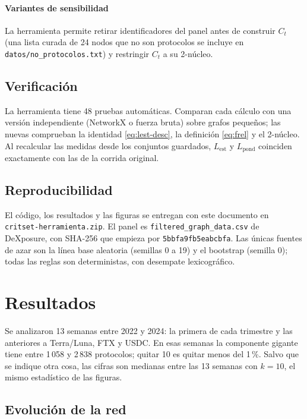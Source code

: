 \documentclass[journal]{IEEEtran}
\begin{document}
\paragraph{Variantes de sensibilidad} La herramienta permite retirar
identificadores del panel antes de construir $C_t$ (una lista curada de 24
nodos que no son protocolos se incluye en \texttt{datos/no\_protocolos.txt}) y
restringir $C_t$ a su 2-núcleo.

\subsection{Verificación}

La herramienta tiene 48 pruebas automáticas. Comparan cada cálculo con una
versión independiente (NetworkX o fuerza bruta) sobre grafos pequeños; las
nuevas comprueban la identidad \eqref{eq:lest-desc}, la definición
\eqref{eq:frel} y el 2-núcleo. Al recalcular las medidas desde los conjuntos
guardados, $L_{\mathrm{est}}$ y $L_{\mathrm{pond}}$ coinciden exactamente con
las de la corrida original.

\subsection{Reproducibilidad}

El código, los resultados y las figuras se entregan con este documento en
\texttt{critset-herramienta.zip}.
El panel es \texttt{filtered\_graph\_data.csv} de DeXposure, con SHA-256 que
empieza por \texttt{5bbfa9fb5eabcbfa}. Las únicas fuentes de azar son la línea
base aleatoria (semillas 0 a 19) y el bootstrap (semilla 0); todas las reglas
son deterministas, con desempate lexicográfico.

\section{Resultados}
\label{sec:resultados}

Se analizaron 13 semanas entre 2022 y 2024: la primera de cada trimestre y las
anteriores a Terra/Luna, FTX y USDC. En esas semanas la componente gigante
tiene entre 1\,058 y 2\,838 protocolos; quitar 10 es quitar menos del 1\,\%.
Salvo que se indique otra cosa, las cifras son medianas entre las 13 semanas
con $k=10$, el mismo estadístico de las figuras.

\subsection{Evolución de la red}
\end{document}
